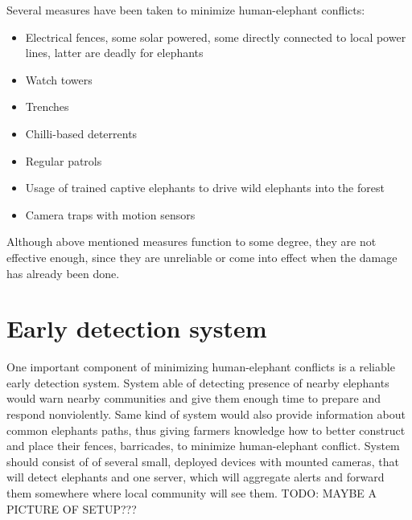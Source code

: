 Several measures have been taken to minimize human-elephant conflicts:
\begin{itemize}
    \item Electrical fences, some solar powered, some directly connected to local power lines, latter are deadly for elephants
    \item Watch towers
    \item Trenches
    \item Chilli-based deterrents
    \item Regular patrols
    \item Usage of trained captive elephants to drive wild elephants into the forest
    \item Camera traps with motion sensors
\end{itemize}

Although above mentioned measures function to some degree, they are not effective enough, since they are unreliable or come into effect when the damage has already been done\cite{wildlabs}. 

\section{ Early detection system}

One important component of minimizing human-elephant conflicts is a reliable early detection system. 
System able of detecting presence of nearby elephants would warn nearby communities and give them enough time to prepare and respond nonviolently.
Same kind of system would also provide information about common elephants paths, thus giving farmers knowledge how to better construct and place their fences, barricades, to minimize human-elephant conflict.
System should consist of of several small, deployed devices with mounted cameras, that will detect elephants and one server, which will aggregate alerts and forward them somewhere where local community will see them.
TODO: MAYBE A PICTURE OF SETUP???


